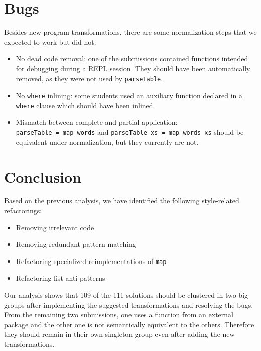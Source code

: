 \documentclass[a4paperpaper,]{report}
\providecommand{\tightlist}{%
  \setlength{\itemsep}{0pt}\setlength{\parskip}{0pt}}
\begin{document}
\hypertarget{bugs}{%
\section{Bugs}\label{bugs}}

Besides new program transformations, there are some normalization steps
that we expected to work but did not:

\begin{itemize}
\tightlist
\item
  No dead code removal: one of the submissions contained functions
  intended for debugging during a REPL session. They should have been
  automatically removed, as they were not used by \texttt{parseTable}.
\item
  No \texttt{where} inlining: some students used an auxiliary function
  declared in a \texttt{where} clause which should have been inlined.
\item
  Mismatch between complete and partial application:
  \texttt{parseTable\ =\ map\ words} and
  \texttt{parseTable\ xs\ =\ map\ words\ xs} should be equivalent under
  normalization, but they currently are not.
\end{itemize}

\hypertarget{conclusion}{%
\section{Conclusion}\label{conclusion}}

Based on the previous analysis, we have identified the following
style-related refactorings:

\begin{itemize}
\tightlist
\item
  Removing irrelevant code
\item
  Removing redundant pattern matching
\item
  Refactoring specialized reimplementations of \texttt{map}
\item
  Refactoring list anti-patterns
\end{itemize}

Our analysis shows that 109 of the 111 solutions should be clustered in
two big groups after implementing the suggested transformations and
resolving the bugs. From the remaining two submissions, one uses a
function from an external package and the other one is not semantically
equivalent to the others. Therefore they should remain in their own
singleton group even after adding the new transformations.
\end{document}
